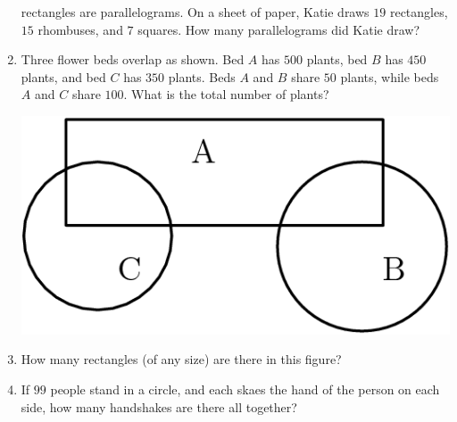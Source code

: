 \documentclass{article}
\begin{document}
\begin{enumerate}
    rectangles are parallelograms. On a sheet of paper, Katie draws $19$ 
    rectangles, $15$ rhombuses, and $7$ squares. How many parallelograms 
    did Katie draw?
    \vspace{3cm}
    \item Three flower beds overlap as shown.
        Bed $A$ has $500$ plants, bed $B$ has $450$ plants, and bed $C$ has $350$ plants.
        Beds $A$ and $B$ share $50$ plants, while beds $A$ and $C$ share $100$.
        What is the total number of plants?
        \begin{center}
            \includegraphics[scale=0.25]{flower-bed.png}
        \end{center}
        \vspace{3cm}
    \item How many rectangles (of any size) are there in this figure?
        \begin{center}
        \end{center}
        \vspace{3cm}
    \item If $99$ people stand in a circle, and each skaes the hand of the 
		person on each side, how many handshakes are there all together?
		\vspace{3cm}
\end{enumerate}
\end{document}
